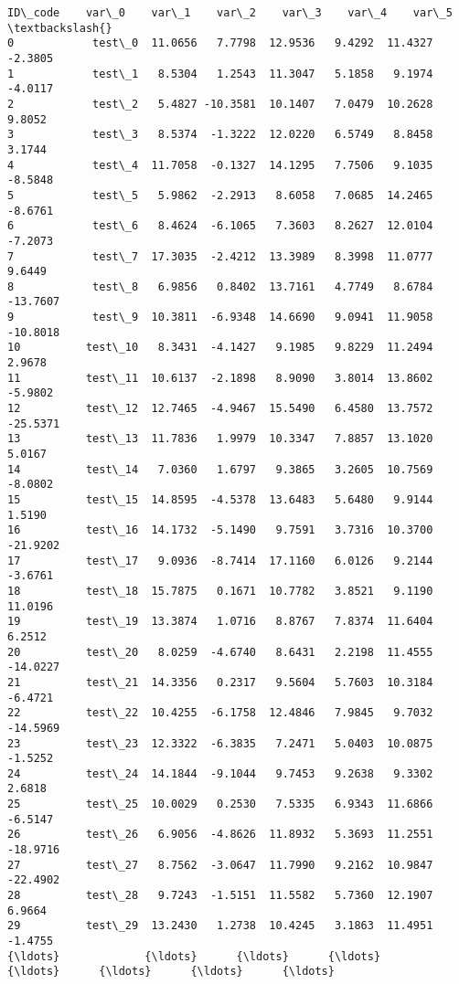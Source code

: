 \documentclass[11pt]{article}
\begin{document}
    \begin{Verbatim}[commandchars=\\\{\}]
            ID\_code    var\_0    var\_1    var\_2    var\_3    var\_4    var\_5  \textbackslash{}
0            test\_0  11.0656   7.7798  12.9536   9.4292  11.4327  -2.3805   
1            test\_1   8.5304   1.2543  11.3047   5.1858   9.1974  -4.0117   
2            test\_2   5.4827 -10.3581  10.1407   7.0479  10.2628   9.8052   
3            test\_3   8.5374  -1.3222  12.0220   6.5749   8.8458   3.1744   
4            test\_4  11.7058  -0.1327  14.1295   7.7506   9.1035  -8.5848   
5            test\_5   5.9862  -2.2913   8.6058   7.0685  14.2465  -8.6761   
6            test\_6   8.4624  -6.1065   7.3603   8.2627  12.0104  -7.2073   
7            test\_7  17.3035  -2.4212  13.3989   8.3998  11.0777   9.6449   
8            test\_8   6.9856   0.8402  13.7161   4.7749   8.6784 -13.7607   
9            test\_9  10.3811  -6.9348  14.6690   9.0941  11.9058 -10.8018   
10          test\_10   8.3431  -4.1427   9.1985   9.8229  11.2494   2.9678   
11          test\_11  10.6137  -2.1898   8.9090   3.8014  13.8602  -5.9802   
12          test\_12  12.7465  -4.9467  15.5490   6.4580  13.7572 -25.5371   
13          test\_13  11.7836   1.9979  10.3347   7.8857  13.1020   5.0167   
14          test\_14   7.0360   1.6797   9.3865   3.2605  10.7569  -8.0802   
15          test\_15  14.8595  -4.5378  13.6483   5.6480   9.9144   1.5190   
16          test\_16  14.1732  -5.1490   9.7591   3.7316  10.3700 -21.9202   
17          test\_17   9.0936  -8.7414  17.1160   6.0126   9.2144  -3.6761   
18          test\_18  15.7875   0.1671  10.7782   3.8521   9.1190  11.0196   
19          test\_19  13.3874   1.0716   8.8767   7.8374  11.6404   6.2512   
20          test\_20   8.0259  -4.6740   8.6431   2.2198  11.4555 -14.0227   
21          test\_21  14.3356   0.2317   9.5604   5.7603  10.3184  -6.4721   
22          test\_22  10.4255  -6.1758  12.4846   7.9845   9.7032 -14.5969   
23          test\_23  12.3322  -6.3835   7.2471   5.0403  10.0875  -1.5252   
24          test\_24  14.1844  -9.1044   9.7453   9.2638   9.3302   2.6818   
25          test\_25  10.0029   0.2530   7.5335   6.9343  11.6866  -6.5147   
26          test\_26   6.9056  -4.8626  11.8932   5.3693  11.2551 -18.9716   
27          test\_27   8.7562  -3.0647  11.7990   9.2162  10.9847 -22.4902   
28          test\_28   9.7243  -1.5151  11.5582   5.7360  12.1907   6.9664   
29          test\_29  13.2430   1.2738  10.4245   3.1863  11.4951  -1.4755   
{\ldots}             {\ldots}      {\ldots}      {\ldots}      {\ldots}      {\ldots}      {\ldots}      {\ldots}   

\end{Verbatim}
\end{document}
